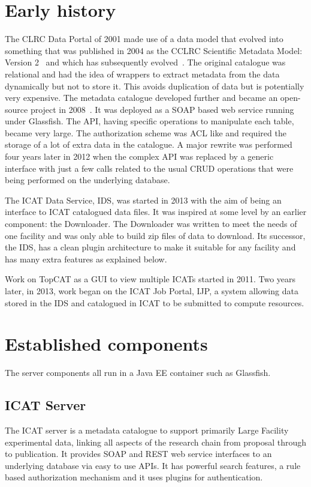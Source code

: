 \documentclass[a4paper]{jpconf}
\begin{document}
\section{Early history}
The CLRC Data Portal of 2001 made use of a data model that evolved
into something that was published in 2004 as the CCLRC Scientific
Metadata Model: Version 2~\cite{ref:csmd2} and which has subsequently
evolved~\cite{ref:csmd4}. The original catalogue was relational and
had the idea of wrappers to extract metadata from the data dynamically
but not to store it. This avoids duplication of data but is
potentially very expensive. The metadata catalogue developed further
and became an open-source project in 2008~\cite{ref:icat_09_1,
  ref:icat_09_2}. It was deployed as a SOAP based web service running
under Glassfish. The API, having specific operations to manipulate
each table, became very large. The authorization scheme was ACL like
and required the storage of a lot of extra data in the catalogue. A
major rewrite was performed four years later in 2012 when the complex
API was replaced by a generic interface with just a few calls related
to the usual CRUD operations that were being performed on the
underlying database.

The ICAT Data Service, IDS, was started in 2013 with the aim of being
an interface to ICAT catalogued data files. It was inspired at some
level by an earlier component: the Downloader. The Downloader was
written to meet the needs of one facility and was only able to build
zip files of data to download. Its successor, the IDS, has a clean
plugin architecture to make it suitable for any facility and has many
extra features as explained below.

Work on TopCAT as a GUI to view multiple ICATs started in 2011. Two
years later, in 2013, work began on the ICAT Job Portal, IJP, a system
allowing data stored in the IDS and catalogued in ICAT to be submitted
to compute resources.
\section{Established components}
The server components all run in a Java EE container such as Glassfish.
\subsection{ICAT Server}
The ICAT server is a metadata catalogue to support primarily Large
Facility experimental data, linking all aspects of the research chain
from proposal through to publication. It provides SOAP and REST web
service interfaces to an underlying database via easy to use APIs. It
has powerful search features, a rule based authorization mechanism and
it uses plugins for authentication. 
\end{document}
